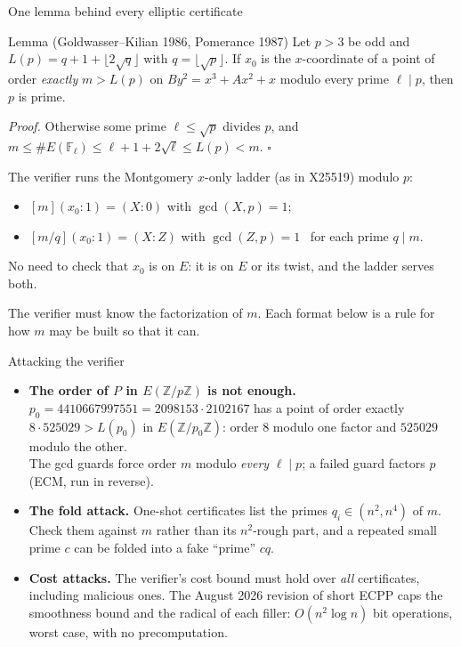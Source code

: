 \documentclass[aspectratio=169,11pt]{beamer}
\newcommand{\F}{\mathbb{F}}
\newcommand{\Z}{\mathbb{Z}}
\begin{document}
\begin{frame}{One lemma behind every elliptic certificate}
\begin{block}{Lemma (Goldwasser--Kilian 1986, Pomerance 1987)}
Let $p>3$ be odd and $L(p) = q+1+\lfloor 2\sqrt q\rfloor$ with $q = \lfloor\sqrt p\rfloor$.
If $x_0$ is the $x$-coordinate of a point of order \emph{exactly} $m > L(p)$ on
$By^2 = x^3 + Ax^2 + x$ \alert{modulo every prime $\ell \mid p$}, then $p$ is prime.
\end{block}
\textit{Proof.} Otherwise some prime $\ell\le\sqrt p$ divides $p$, and
$m \le \#E(\F_\ell) \le \ell + 1 + 2\sqrt\ell \le L(p) < m$. \hfill$\square$

\bigskip
The verifier runs the Montgomery $x$-only ladder (as in X25519) modulo $p$:
\begin{itemize}
\item $[m](x_0:1) = (X:0)$ with $\gcd(X,p) = 1$;
\item $[m/q](x_0:1) = (X:Z)$ with $\gcd(Z,p) = 1$ \ for each prime $q\mid m$.
\end{itemize}
No need to check that $x_0$ is on $E$: it is on $E$ or its twist, and the ladder serves both.

\bigskip
\alert{The verifier must know the factorization of $m$.}
Each format below is a rule for how $m$ may be built so that it can.
\end{frame}

\begin{frame}{Attacking the verifier}
\begin{itemize}
\item \textbf{The order of $P$ in $E(\Z/p\Z)$ is not enough.}
$p_0 = 4410667997551 = 2098153\cdot 2102167$ has a point of order exactly $8\cdot 525029 > L(p_0)$
in $E(\Z/p_0\Z)$: order $8$ modulo one factor and $525029$ modulo the other.\\
The gcd guards force order $m$ modulo \emph{every} $\ell\mid p$; a failed guard factors $p$
(ECM, run in reverse).
\medskip
\item \textbf{The fold attack.} One-shot certificates list the primes $q_i\in(n^2,n^4)$ of $m$.
Check them against $m$ rather than its $n^2$-rough part, and a repeated small prime $c$ can be
folded into a fake ``prime'' $cq$.
\medskip
\item \textbf{Cost attacks.} The verifier's cost bound must hold over \emph{all} certificates,
including malicious ones.  The August 2026 revision of short ECPP caps the smoothness bound and
the radical of each filler: $O(n^2\log n)$ bit operations, worst case, with no precomputation.
\end{itemize}
\end{frame}
\end{document}
